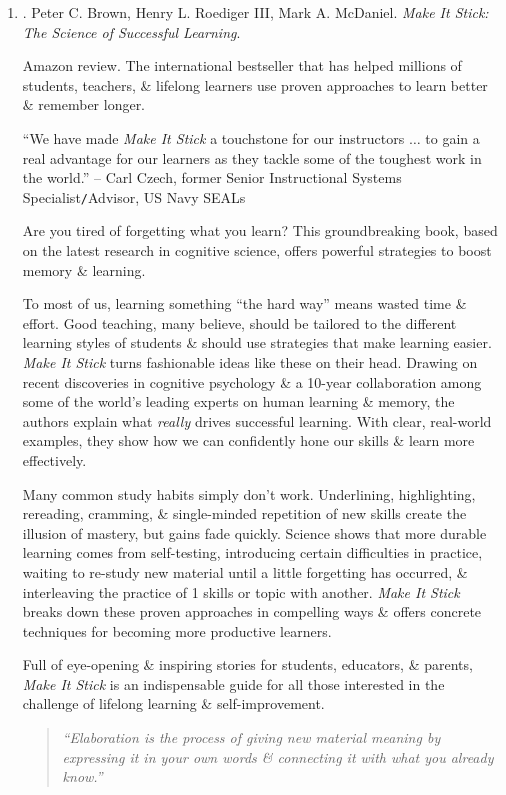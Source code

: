 \documentclass{article}
\begin{document}
\begin{enumerate}
	\item \cite{Brown_Roediger_McDaniel_stick}. {\sc Peter C. Brown, Henry L. Roediger III, Mark A. McDaniel}. {\it Make It Stick: The Science of Successful Learning}.

	{\sf Amazon review.} The international bestseller that has helped millions of students, teachers, \& lifelong learners use proven approaches to learn better \& remember longer.

	``We have made {\it Make It Stick} a touchstone for our instructors $\ldots$ to gain a real advantage for our learners as they tackle some of the toughest work in the world.'' -- {\sc Carl Czech}, former Senior Instructional Systems Specialist{\tt/}Advisor, US Navy SEALs

	Are you tired of forgetting what you learn? This groundbreaking book, based on the latest research in cognitive science, offers powerful strategies to boost memory \& learning.

	To most of us, learning something ``the hard way'' means wasted time \& effort. Good teaching, many believe, should be tailored to the different learning styles of students \& should use strategies that make learning easier. {\it Make It Stick} turns fashionable ideas like these on their head. Drawing on recent discoveries in cognitive psychology \& a 10-year collaboration among some of the world's leading experts on human learning \& memory, the authors explain what {\it really} drives successful learning. With clear, real-world examples, they show how we can confidently hone our skills \& learn more effectively.

	Many common study habits simply don't work. Underlining, highlighting, rereading, cramming, \& single-minded repetition of new skills create the illusion of mastery, but gains fade quickly. Science shows that more durable learning comes from self-testing, introducing certain difficulties in practice, waiting to re-study new material until a little forgetting has occurred, \& interleaving the practice of 1 skills or topic with another. {\it Make It Stick} breaks down these proven approaches in compelling ways \& offers concrete techniques for becoming more productive learners.

	Full of eye-opening \& inspiring stories for students, educators, \& parents, {\it Make It Stick} is an indispensable guide for all those interested in the challenge of lifelong learning \& self-improvement.
	\begin{quotation}
		{\it``Elaboration is the process of giving new material meaning by expressing it in your own words \& connecting it with what you already know.''}


\end{quotation}
\end{enumerate}
\end{document}
